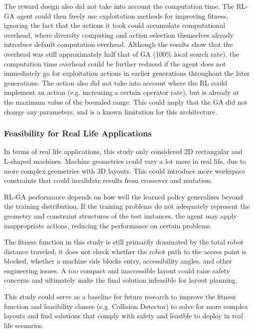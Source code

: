 \documentclass{article}
\begin{document}
The reward design also did not take into account the computation time. The RL-GA agent could then freely use exploitation methods for improving fitness, ignoring the fact that the actions it took could accumulate computational overhead, where diversity computing and action selection themselves already introduce default computation overhead. Although the results show that the overhead was still approximately half that of GA (100\% local search rate), the computation time overhead could be further reduced if the agent does not immediately go for exploitation actions in earlier generations throughout the later generations. The action also did not take into account where the RL could implement an action (e.g. increasing a certain operator rate), but is already at the maximum value of the bounded range. This could imply that the GA did not change any parameters, and is a known limitation for this architecture.

\subsubsection{Feasibility for Real Life Applications}
In terms of real life applications, this study only considered 2D rectangular and L-shaped machines. Machine geometries could vary a lot more in real life, due to more complex geometries with 3D layouts. This could introduce more workspace constraints that could invalidate results from crossover and mutation.

RL-GA performance depends on how well the learned policy generalizes beyond the training distribution. If the training problems do not adequately represent the geometry and constraint structures of the test instances, the agent may apply inappropriate actions, reducing the performance on certain problems.

The fitness function in this study is still primarily dominated by the total robot distance traveled, it does not check whether the robot path to the access point is blocked, whether a machine side blocks entry, accessibility angles, and other engineering issues. A too compact and inaccessible layout could raise safety concerns and ultimately make the final solution infeasible for layout planning. 

This study could serve as a baseline for future research to improve the fitness function and feasibility classes (e.g. Collision Detector) to solve for more complex layouts and find solutions that comply with safety and feasible to deploy in real life scenarios.
\end{document}
